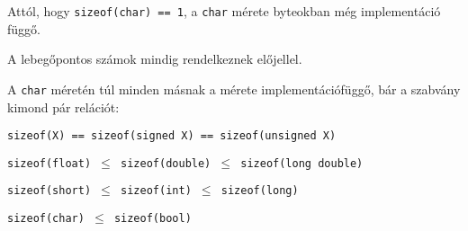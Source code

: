 \documentclass[a4paper,11.5pt,table]{article}
\begin{document}
  Attól, hogy \texttt{sizeof(char) == 1}, a \texttt{char} mérete byteokban még implementáció függő.

  A lebegőpontos számok mindig rendelkeznek előjellel. 
	
	\medskip
	A \texttt{char} méretén túl minden másnak a mérete implementációfüggő, bár a szabvány kimond pár relációt:
	\begin{center}
		\texttt{sizeof(X) == sizeof(signed X) == sizeof(unsigned X)}
		\smallskip
		
		\texttt{sizeof(float) $\leq$ sizeof(double) $\leq$ sizeof(long double)}
		\smallskip
		
		\texttt{sizeof(short) $\leq$ sizeof(int) $\leq$ sizeof(long)}
		\smallskip
		
		\texttt{sizeof(char) $\leq$ sizeof(bool)}
		\smallskip
	\end{center}
\end{document}
